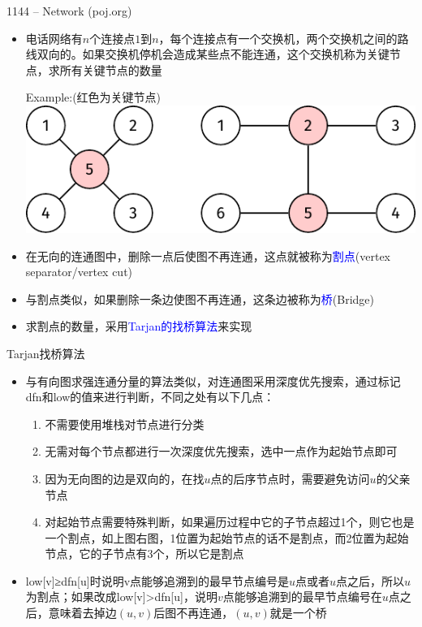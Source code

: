\begin{frame}{1144 -- Network (poj.org)}
    \begin{itemize}
        \item 电话网络有$n$个连接点$1$到$n$，每个连接点有一个交换机，两个交换机之间的路线双向的。如果交换机停机会造成某些点不能连通，这个交换机称为关键节点，求所有关键节点的数量
        \begin{exampleblock}{Example:(红色为关键节点)}
            \includegraphics[scale=.8,center]{fig/8-6.pdf}
        \end{exampleblock}
        \item 在无向的连通图中，删除一点后使图不再连通，这点就被称为\textcolor{blue}{割点}(vertex separator/vertex cut)
        \item 与割点类似，如果删除一条边使图不再连通，这条边被称为\textcolor{blue}{桥}(Bridge)
        \item 求割点的数量，采用\textcolor{blue}{Tarjan的找桥算法}来实现
    \end{itemize}
\end{frame}
\begin{frame}{Tarjan找桥算法}
    \begin{itemize}
        \item 与有向图求强连通分量的算法类似，对连通图采用深度优先搜索，通过标记dfn和low的值来进行判断，不同之处有以下几点：
        \begin{enumerate}[(1)]
            \item 不需要使用堆栈对节点进行分类
            \item 无需对每个节点都进行一次深度优先搜索，选中一点作为起始节点即可
            \item 因为无向图的边是双向的，在找$u$点的后序节点时，需要避免访问$u$的父亲节点
            \item 对起始节点需要特殊判断，如果遍历过程中它的子节点超过1个，则它也是一个割点，如上图右图，1位置为起始节点的话不是割点，而2位置为起始节点，它的子节点有3个，所以它是割点
        \end{enumerate}
        \item low[v]≥dfn[u]时说明v点能够追溯到的最早节点编号是$u$点或者$u$点之后，所以$u$为割点；如果改成low[v]>dfn[u]，说明$v$点能够追溯到的最早节点编号在$u$点之后，意味着去掉边$(u,v)$后图不再连通，$(u,v)$就是一个桥
    \end{itemize}
\end{frame}
